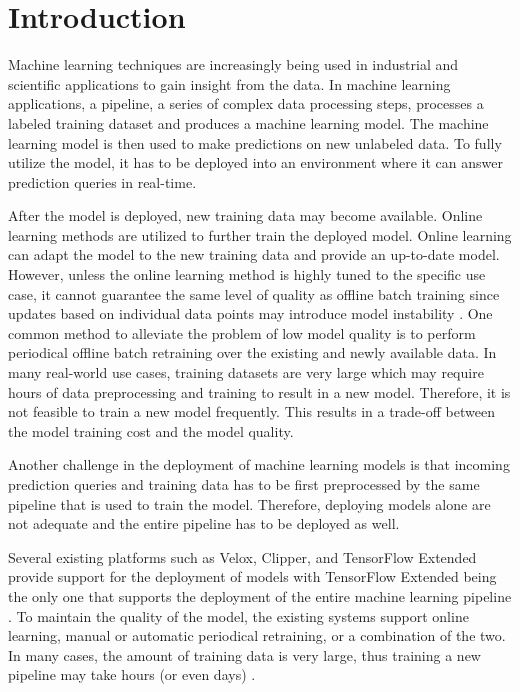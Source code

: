 \section{Introduction} \label{introduction}
Machine learning techniques are increasingly being used in industrial and scientific applications to gain insight from the data.
In machine learning applications, a pipeline, a series of complex data processing steps, processes a labeled training dataset and produces a machine learning model.
The machine learning model is then used to make predictions on new unlabeled data.
To fully utilize the model, it has to be deployed into an environment where it can answer prediction queries in real-time.

After the model is deployed, new training data may become available.
Online learning methods are utilized to further train the deployed model.
Online learning can adapt the model to the new training data and provide an up-to-date model.
However, unless the online learning method is highly tuned to the specific use case, it cannot guarantee the same level of quality as offline batch training since updates based on individual data points may introduce model instability \cite{ma2009identifying, macmahan2013}. 
One common method to alleviate the problem of low model quality is to perform periodical offline batch retraining over the existing and newly available data.
In many real-world use cases, training datasets are very large which may require hours of data preprocessing and training to result in a new model.
Therefore, it is not feasible to train a new model frequently.
This results in a trade-off between the model training cost and the model quality.

Another challenge in the deployment of machine learning models is that incoming prediction queries and training data has to be first preprocessed by the same pipeline that is used to train the model.
Therefore, deploying models alone are not adequate and the entire pipeline has to be deployed as well.

Several existing platforms such as Velox, Clipper, and TensorFlow Extended provide support for the deployment of models with TensorFlow Extended being the only one that supports the deployment of the entire machine learning pipeline \cite{crankshaw2014missing, crankshaw2016clipper, agarwal2014laser, baylor2017tfx}.
To maintain the quality of the model, the existing systems support online learning, manual or automatic periodical retraining, or a combination of the two.
In many cases, the amount of training data is very large, thus training a new pipeline may take hours (or even days) \cite{baylor2017tfx}.

